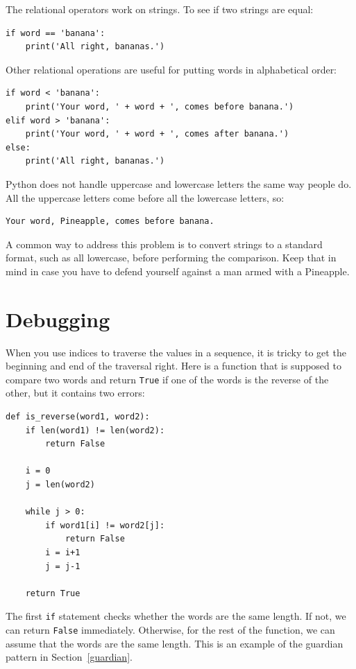 \documentclass[10pt]{book}
\begin{document}
The relational operators work on strings.  To see if two strings are equal:

\begin{verbatim}
if word == 'banana':
    print('All right, bananas.')
\end{verbatim}
%
Other relational operations are useful for putting words in alphabetical
order:

\begin{verbatim}
if word < 'banana':
    print('Your word, ' + word + ', comes before banana.')
elif word > 'banana':
    print('Your word, ' + word + ', comes after banana.')
else:
    print('All right, bananas.')
\end{verbatim}
%
Python does not handle uppercase and lowercase letters the same way
people do.  All the uppercase letters come before all the
lowercase letters, so:

\begin{verbatim}
Your word, Pineapple, comes before banana.
\end{verbatim}
%
A common way to address this problem is to convert strings to a
standard format, such as all lowercase, before performing the
comparison.  Keep that in mind in case you have to defend yourself
against a man armed with a Pineapple.


\section{Debugging}

When you use indices to traverse the values in a sequence,
it is tricky to get the beginning and end of the traversal
right.  Here is a function that is supposed to compare two
words and return {\tt True} if one of the words is the reverse
of the other, but it contains two errors:

\begin{verbatim}
def is_reverse(word1, word2):
    if len(word1) != len(word2):
        return False
    
    i = 0
    j = len(word2)

    while j > 0:
        if word1[i] != word2[j]:
            return False
        i = i+1
        j = j-1

    return True
\end{verbatim}
%
The first {\tt if} statement checks whether the words are the
same length.  If not, we can return {\tt False} immediately.
Otherwise, for the rest of the function, we can assume that the words
are the same length.  This is an example of the guardian pattern
in Section~\ref{guardian}.
\end{document}
